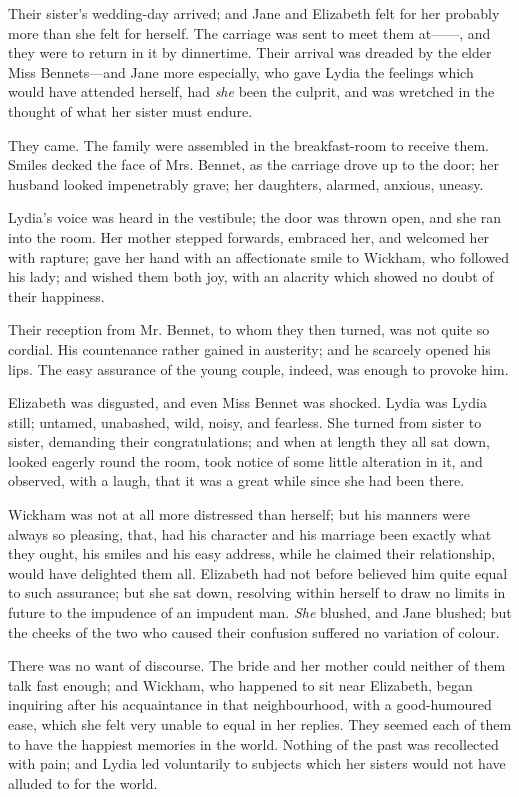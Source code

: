Their sister's wedding-day arrived; and Jane and Elizabeth felt for her probably more than she felt for herself. The carriage was sent to meet them at------, and they were to return in it by dinnertime. Their arrival was dreaded by the elder Miss Bennets---and Jane more especially, who gave Lydia the feelings which would have attended herself, had \textit{she} been the culprit, and was wretched in the thought of what her sister must endure.

They came. The family were assembled in the breakfast-room to receive them. Smiles decked the face of Mrs. Bennet, as the carriage drove up to the door; her husband looked impenetrably grave; her daughters, alarmed, anxious, uneasy.

Lydia's voice was heard in the vestibule; the door was thrown open, and she ran into the room. Her mother stepped forwards, embraced her, and welcomed her with rapture; gave her hand with an affectionate smile to Wickham, who followed his lady; and wished them both joy, with an alacrity which showed no doubt of their happiness.

Their reception from Mr. Bennet, to whom they then turned, was not quite so cordial. His countenance rather gained in austerity; and he scarcely opened his lips. The easy assurance of the young couple, indeed, was enough to provoke him.

Elizabeth was disgusted, and even Miss Bennet was shocked. Lydia was Lydia still; untamed, unabashed, wild, noisy, and fearless. She turned from sister to sister, demanding their congratulations; and when at length they all sat down, looked eagerly round the room, took notice of some little alteration in it, and observed, with a laugh, that it was a great while since she had been there.

Wickham was not at all more distressed than herself; but his manners were always so pleasing, that, had his character and his marriage been exactly what they ought, his smiles and his easy address, while he claimed their relationship, would have delighted them all. Elizabeth had not before believed him quite equal to such assurance; but she sat down, resolving within herself to draw no limits in future to the impudence of an impudent man. \textit{She} blushed, and Jane blushed; but the cheeks of the two who caused their confusion suffered no variation of colour.

There was no want of discourse. The bride and her mother could neither of them talk fast enough; and Wickham, who happened to sit near Elizabeth, began inquiring after his acquaintance in that neighbourhood, with a good-humoured ease, which she felt very unable to equal in her replies. They seemed each of them to have the happiest memories in the world. Nothing of the past was recollected with pain; and Lydia led voluntarily to subjects which her sisters would not have alluded to for the world.

